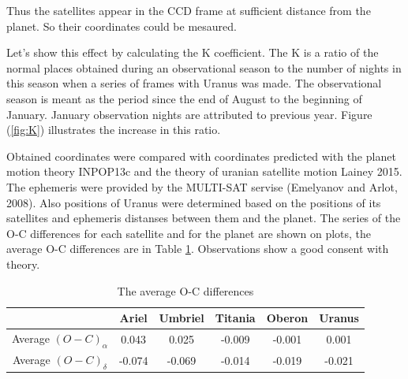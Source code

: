 \documentclass[]{article}
\begin{document}
 Thus the satellites appear in the CCD frame at sufficient distance from the planet. So their coordinates could be mesaured.\par
Let's show this effect by calculating the K coefficient. The K is a ratio of the normal places obtained during an observational season to the number of nights in this season when a series of frames with Uranus was made. The observational season is meant as the period since the end of August to the beginning of January. January observation nights are attributed to previous year. Figure (\ref{fig:K}) illustrates the increase in this ratio.\par


Obtained coordinates were compared with coordinates predicted with the planet motion theory INPOP13c and the theory of uranian satellite motion Lainey 2015. The ephemeris were provided by the MULTI-SAT servise (Emelyanov and Arlot, 2008). Also positions of Uranus were determined based on the positions of its satellites and ephemeris distanses between them and the planet.  The series of the O-C differences for each satellite and for the planet are shown on plots, the average O-C differences are in Table \ref{mean_OC}.
 Observations show a good consent with theory.\par
\begin{table}
\begin{center}
\caption{The average O-C differences}
\label{mean_OC}
\begin{tabular}{|c|c|c|c|c|c|}
\hline
& Ariel&Umbriel&Titania& Oberon & Uranus \\
\hline
Average $(O-C)_\alpha$ & 0.043 & 0.025 & -0.009 & -0.001 & 0.001\\
Average $(O-C)_\delta$ & -0.074 & -0.069 & -0.014 & -0.019 & -0.021\\
\hline
\end{tabular}
\end{center}
\end{table}

\newpage
\end{document}
